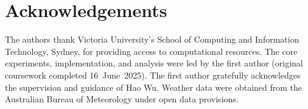 \documentclass[12pt,a4paper]{article}
\begin{document}
\section*{Acknowledgements}

The authors thank Victoria University's School of Computing and Information
Technology, Sydney, for providing access to computational resources. The core
experiments, implementation, and analysis were led by the first author
(original coursework completed 16~June~2025). The first author gratefully
acknowledges the supervision and guidance of Hao Wu. Weather data were obtained
from the Australian Bureau of Meteorology under open data provisions.


\end{document}
